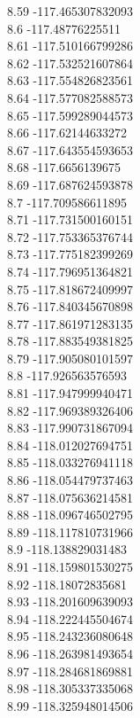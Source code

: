 {8.59	-117.465307832093\\
8.6	-117.48776225511\\
8.61	-117.510166799286\\
8.62	-117.532521607864\\
8.63	-117.554826823561\\
8.64	-117.577082588573\\
8.65	-117.599289044573\\
8.66	-117.62144633272\\
8.67	-117.643554593653\\
8.68	-117.6656139675\\
8.69	-117.687624593878\\
8.7	-117.709586611895\\
8.71	-117.731500160151\\
8.72	-117.753365376744\\
8.73	-117.775182399269\\
8.74	-117.796951364821\\
8.75	-117.818672409997\\
8.76	-117.840345670898\\
8.77	-117.861971283135\\
8.78	-117.883549381825\\
8.79	-117.905080101597\\
8.8	-117.926563576593\\
8.81	-117.947999940471\\
8.82	-117.969389326406\\
8.83	-117.990731867094\\
8.84	-118.012027694751\\
8.85	-118.033276941118\\
8.86	-118.054479737463\\
8.87	-118.075636214581\\
8.88	-118.096746502795\\
8.89	-118.117810731966\\
8.9	-118.138829031483\\
8.91	-118.159801530275\\
8.92	-118.18072835681\\
8.93	-118.201609639093\\
8.94	-118.222445504674\\
8.95	-118.243236080648\\
8.96	-118.263981493654\\
8.97	-118.284681869881\\
8.98	-118.305337335068\\
8.99	-118.325948014506\\
}
